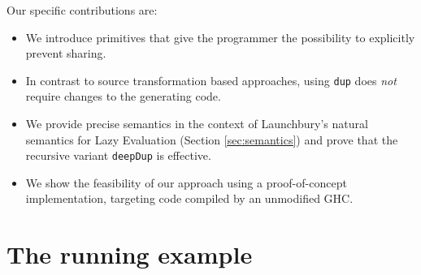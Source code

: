\documentclass[preprint]{sigplanconf}
\theoremstyle{nonumberplain}
\newcommand{\li}{\lstinline[style=Haskell]}
\begin{document}
Our specific contributions are:
\begin{itemize}
\item We introduce primitives that give the programmer the possibility to explicitly prevent sharing.
\item In contrast to source transformation based approaches, using \li-dup- does \emph{not} require changes to the generating code.
\item We provide precise semantics in the context of Launchbury’s natural semantics for Lazy Evaluation (Section \ref{sec:semantics}) and prove that the recursive variant \li-deepDup- is effective.
\item We show the feasibility of our approach using a proof-of-concept implementation, targeting code compiled by an unmodified GHC.
\end{itemize}

\section{The running example}
\label{sec:example}
\end{document}
